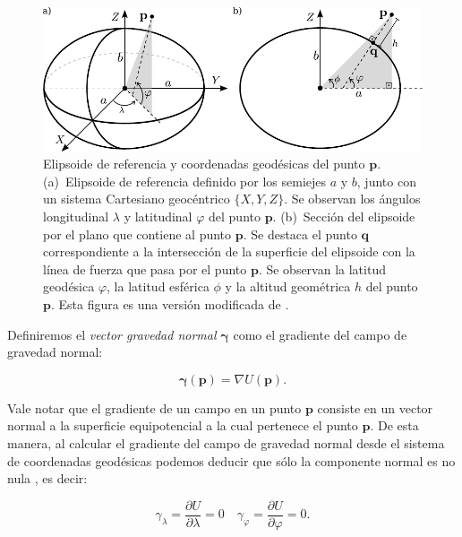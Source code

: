 \begin{figure}
    \centering
    \includegraphics[width=\linewidth]{figs/cartesian-geodetic-systems.pdf}
    \caption{
        Elipsoide de referencia y coordenadas geodésicas del punto
        $\mathbf{p}$.
        (a)~Elipsoide de referencia definido por los
        semiejes $a$ y $b$, junto con un sistema
        Cartesiano geocéntrico $\{X, Y, Z\}$. Se observan los ángulos
        longitudinal $\lambda$ y latitudinal $\varphi$ del punto
        $\mathbf{p}$.
        (b)~Sección del elipsoide por el plano que contiene al punto
        $\mathbf{p}$. Se destaca el punto $\mathbf{q}$ correspondiente
        a la intersección de la superficie del elipsoide con la línea de
        fuerza que pasa por el punto $\mathbf{p}$.
        Se observan la latitud geodésica $\varphi$, la latitud esférica
        $\phi$ y la altitud geométrica $h$ del punto $\mathbf{p}$.
        Esta figura es una versión modificada de \citet{oliveira2021}.
    }
    \label{fig:coordenadas-geodesicas}
\end{figure}

Definiremos el \emph{vector gravedad normal} $\boldsymbol\gamma$ como el
gradiente del campo de gravedad normal:

\begin{equation}
    \boldsymbol\gamma(\mathbf{p}) = \nabla U(\mathbf{p}).
\end{equation}

Vale notar que el gradiente de un campo en un punto $\mathbf{p}$ consiste en un
vector normal a la superficie equipotencial a la cual pertenece el punto
$\mathbf{p}$.
De esta manera, al calcular el gradiente del campo de gravedad normal desde el
sistema de coordenadas geodésicas podemos deducir que sólo la componente
normal es no nula \citep[][p.~68]{heiskanen1967}, es decir:

\begin{equation}
    \gamma_\lambda =
        \frac{\partial U}{\partial \lambda} = 0  \quad
    \gamma_\varphi =
        \frac{\partial U}{\partial \varphi} = 0.
\end{equation}

